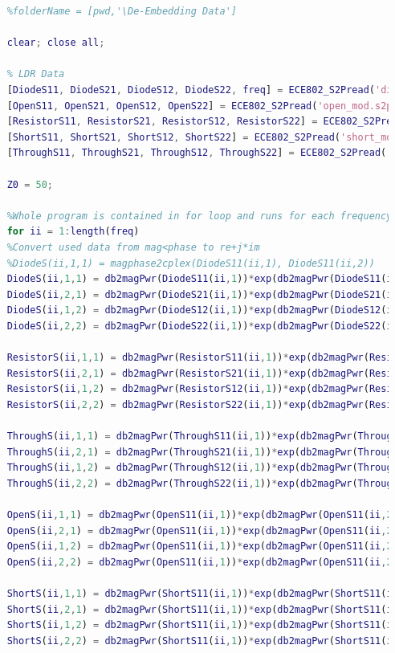 \documentclass{article} %
\begin{document}
	\begin{lstlisting}[language=Matlab, caption=De-embedding MATLAB Code]
	%802 deembedding shit draft
	%folderName = [pwd,'\De-Embedding Data']
	
	clear; close all;
	
	% LDR Data
	[DiodeS11, DiodeS21, DiodeS12, DiodeS22, freq] = ECE802_S2Pread('diode_mod.s2p');
	[OpenS11, OpenS21, OpenS12, OpenS22] = ECE802_S2Pread('open_mod.s2p');
	[ResistorS11, ResistorS21, ResistorS12, ResistorS22] = ECE802_S2Pread('resistor_mod.s2p');
	[ShortS11, ShortS21, ShortS12, ShortS22] = ECE802_S2Pread('short_mod.s2p');
	[ThroughS11, ThroughS21, ThroughS12, ThroughS22] = ECE802_S2Pread('through_mod.s2p');
	
	Z0 = 50;
	
	%Whole program is contained in for loop and runs for each frequency
	for ii = 1:length(freq)
	%Convert used data from mag<phase to re+j*im
	%DiodeS(ii,1,1) = magphase2cplex(DiodeS11(ii,1), DiodeS11(ii,2))
	DiodeS(ii,1,1) = db2magPwr(DiodeS11(ii,1))*exp(db2magPwr(DiodeS11(ii,2))*sqrt(-1));
	DiodeS(ii,2,1) = db2magPwr(DiodeS21(ii,1))*exp(db2magPwr(DiodeS21(ii,2))*sqrt(-1));
	DiodeS(ii,1,2) = db2magPwr(DiodeS12(ii,1))*exp(db2magPwr(DiodeS12(ii,2))*sqrt(-1));
	DiodeS(ii,2,2) = db2magPwr(DiodeS22(ii,1))*exp(db2magPwr(DiodeS22(ii,2))*sqrt(-1));
	
	ResistorS(ii,1,1) = db2magPwr(ResistorS11(ii,1))*exp(db2magPwr(ResistorS11(ii,2))*sqrt(-1));
	ResistorS(ii,2,1) = db2magPwr(ResistorS21(ii,1))*exp(db2magPwr(ResistorS21(ii,2))*sqrt(-1));
	ResistorS(ii,1,2) = db2magPwr(ResistorS12(ii,1))*exp(db2magPwr(ResistorS12(ii,2))*sqrt(-1));
	ResistorS(ii,2,2) = db2magPwr(ResistorS22(ii,1))*exp(db2magPwr(ResistorS22(ii,2))*sqrt(-1));
	
	ThroughS(ii,1,1) = db2magPwr(ThroughS11(ii,1))*exp(db2magPwr(ThroughS11(ii,2))*sqrt(-1));
	ThroughS(ii,2,1) = db2magPwr(ThroughS21(ii,1))*exp(db2magPwr(ThroughS21(ii,2))*sqrt(-1));
	ThroughS(ii,1,2) = db2magPwr(ThroughS12(ii,1))*exp(db2magPwr(ThroughS12(ii,2))*sqrt(-1));
	ThroughS(ii,2,2) = db2magPwr(ThroughS22(ii,1))*exp(db2magPwr(ThroughS22(ii,2))*sqrt(-1));
	
	OpenS(ii,1,1) = db2magPwr(OpenS11(ii,1))*exp(db2magPwr(OpenS11(ii,2))*sqrt(-1));
	OpenS(ii,2,1) = db2magPwr(OpenS11(ii,1))*exp(db2magPwr(OpenS11(ii,2))*sqrt(-1));
	OpenS(ii,1,2) = db2magPwr(OpenS11(ii,1))*exp(db2magPwr(OpenS11(ii,2))*sqrt(-1));
	OpenS(ii,2,2) = db2magPwr(OpenS11(ii,1))*exp(db2magPwr(OpenS11(ii,2))*sqrt(-1));
	
	ShortS(ii,1,1) = db2magPwr(ShortS11(ii,1))*exp(db2magPwr(ShortS11(ii,2))*sqrt(-1));
	ShortS(ii,2,1) = db2magPwr(ShortS11(ii,1))*exp(db2magPwr(ShortS11(ii,2))*sqrt(-1));
	ShortS(ii,1,2) = db2magPwr(ShortS11(ii,1))*exp(db2magPwr(ShortS11(ii,2))*sqrt(-1));
	ShortS(ii,2,2) = db2magPwr(ShortS11(ii,1))*exp(db2magPwr(ShortS11(ii,2))*sqrt(-1));
	

\end{lstlisting}
\end{document}
